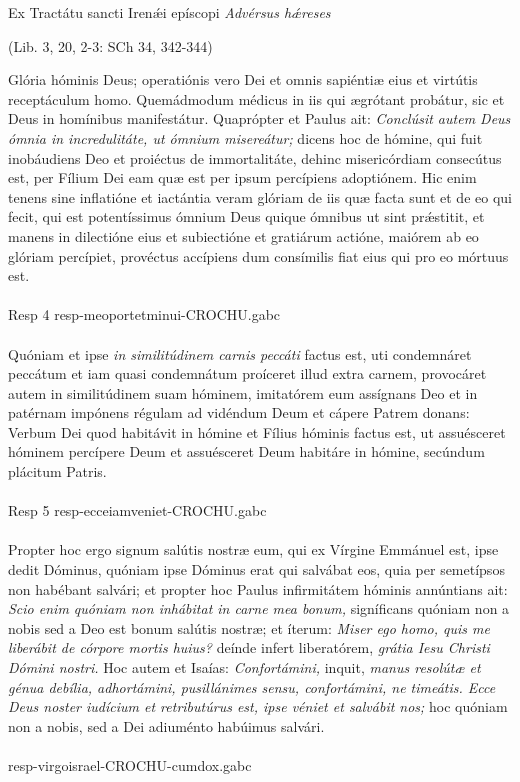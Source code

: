\documentclass[options]{article}
\begin{document}
	Ex Tractátu sancti Iren\'{æ}i epíscopi \emph{Advérsus h\'{æ}reses}\\
	\begin{flushright}
		(Lib. 3, 20, 2-3: SCh 34, 342-344)	
	\end{flushright}	
	Glória hóminis Deus; operatiónis vero Dei et omnis sapiéntiæ eius et virtútis receptáculum homo. Quemádmodum médicus in iis qui ægrótant probátur, sic et Deus in homínibus manifestátur. Quaprópter et Paulus ait: \emph{Conclúsit autem Deus ómnia in incredulitáte, ut ómnium misereátur;} dicens hoc de hómine, qui fuit inobáudiens Deo et proiéctus de immortalitáte, dehinc misericórdiam consecútus est, per Fílium Dei eam quæ est per ipsum percípiens adoptiónem.
	Hic enim tenens sine inflatióne et iactántia veram glóriam de iis quæ facta sunt et de eo qui fecit, qui est potentíssimus ómnium Deus quique ómnibus ut sint pr\'{æ}stitit, et manens in dilectióne eius et subiectióne et gratiárum actióne, maiórem ab eo glóriam percípiet, provéctus accípiens dum consímilis fiat eius qui pro eo mórtuus est.\\
	\\
	Resp 4  resp-meoportetminui-CROCHU.gabc\\
	\\
	Quóniam et ipse \emph{in similitúdinem carnis peccáti} factus est, uti condemnáret peccátum et iam quasi condemnátum proíceret illud extra carnem, provocáret autem in similitúdinem suam hóminem, imitatórem eum assígnans Deo et in patérnam impónens régulam ad vidéndum Deum et cápere Patrem donans: Verbum Dei quod habitávit in hómine et Fílius hóminis factus est, ut assuésceret hóminem percípere Deum et assuésceret Deum habitáre in hómine, secúndum plácitum Patris.\\
	\\
	Resp 5 resp-ecceiamveniet-CROCHU.gabc\\
	\\
	Propter hoc ergo signum salútis nostræ eum, qui ex Vírgine Emmánuel est, ipse dedit Dóminus, quóniam ipse Dóminus erat qui salvábat eos, quia per semetípsos non habébant salvári; et propter hoc Paulus infirmitátem hóminis annúntians ait: \emph{Scio enim quóniam non inhábitat in carne mea bonum,} signíficans quóniam non a nobis sed a Deo est bonum salútis nostræ; et íterum: \emph{Miser ego homo, quis me liberábit de córpore mortis huius?} deínde infert liberatórem, \emph{grátia Iesu Christi Dómini nostri.}
	Hoc autem et Isaías: \emph{Confortámini,} inquit, \emph{manus resolútæ et génua debília, adhortámini, pusillánimes sensu, confortámini, ne timeátis. Ecce Deus noster iudícium et retributúrus est, ipse véniet et salvábit nos;} hoc quóniam non a nobis, sed a Dei adiuménto habúimus salvári.\\
	\\
	resp-virgoisrael-CROCHU-cumdox.gabc
\end{document}
